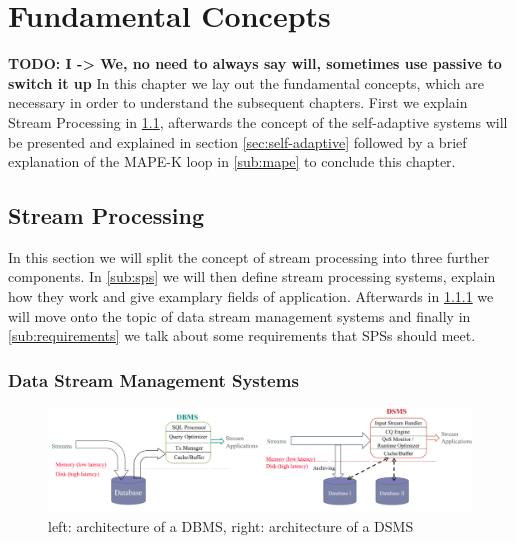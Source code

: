 
\chapter{Fundamental Concepts}
\label{cha:fundamentals}
\textbf{TODO: I -> We, no need to always say will, sometimes use passive to switch it up}
In this chapter we lay out the fundamental concepts, which are necessary in order to understand the subsequent chapters.
First we explain Stream Processing in \ref{sec:stream-processing}, afterwards the concept of the self-adaptive systems will be presented and explained in section \ref{sec:self-adaptive} 
followed by a brief explanation of the MAPE-K loop in \ref{sub:mape} to conclude this chapter.

    \section{Stream Processing}
    \label{sec:stream-processing}
    In this section we will split the concept of stream processing into three further components.
    In \ref{sub:sps} we will then define stream processing systems, explain how they work and give examplary fields of application.
    Afterwards in \ref{sub:dsms} we will move onto the topic of data stream management systems and finally in \ref{sub:requirements} we talk about
    some requirements that SPSs should meet.
    
        \subsection{Data Stream Management Systems}
        \label{sub:dsms}

        \begin{figure}[h]
            \label{fig:dbms_dsms}
            \centering
            \includegraphics[width=1.0\textwidth]{Bilder/dbms_dsms.png}
            \caption{
                   left: architecture of a DBMS, right: architecture of a DSMS
                   }
        \end{figure}

